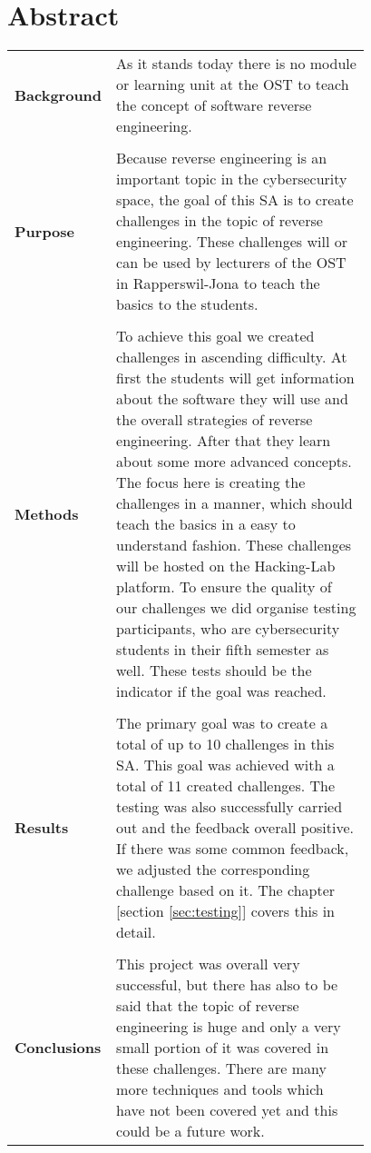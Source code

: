 \chapter{Abstract}
\begin{table}[H]
    \begin{tabular}{lp{0.78\linewidth}}
    \textbf{Background} & As it stands today there is no module or learning unit at the OST to teach the concept of software reverse engineering. \\
    \\
    \textbf{Purpose}    & Because reverse engineering is an important topic in the cybersecurity space, the goal of this SA is to create challenges in the topic of reverse engineering. These challenges will or can be used by lecturers of the OST in Rapperswil-Jona to teach the basics to the students. \\
    \\
    \textbf{Methods}    & To achieve this goal we created challenges in ascending difficulty. At first the students will get information about the software they will use and the overall strategies of reverse engineering. After that they learn about some more advanced concepts. The focus here is creating the challenges in a manner, which should teach the basics in a easy to understand fashion. These challenges will be hosted on the Hacking-Lab platform. To ensure the quality of our challenges we did organise testing participants, who are cybersecurity students in their fifth semester as well. These tests should be the indicator if the goal was reached. \\
    \\
    \textbf{Results}    & The primary goal was to create a total of up to 10 challenges in this SA. This goal was achieved with a total of 11 created challenges. The testing was also successfully carried out and the feedback overall positive. If there was some common feedback, we adjusted the corresponding challenge based on it. The chapter [section \ref{sec:testing}] covers this in detail. \\
    \\
    \textbf{Conclusions} & This project was overall very successful, but there has also to be said that the topic of reverse engineering is huge and only a very small portion of it was covered in these challenges. There are many more techniques and tools which have not been covered yet and this could be a future work. 
    \end{tabular}
\end{table}
